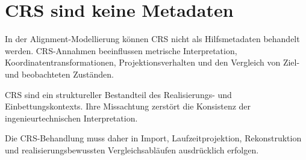 \section*{CRS sind keine Metadaten}

In der Alignment-Modellierung können CRS nicht als Hilfsmetadaten behandelt
werden. CRS-Annahmen beeinflussen metrische Interpretation,
Koordinatentransformationen, Projektionsverhalten und den Vergleich von Ziel-
und beobachteten Zuständen.

\begin{principle}
CRS sind ein struktureller Bestandteil des Realisierungs- und
Einbettungskontexts. Ihre Missachtung zerstört die Konsistenz der
ingenieurtechnischen Interpretation.
\end{principle}

Die CRS-Behandlung muss daher in Import, Laufzeitprojektion, Rekonstruktion
und realisierungsbewussten Vergleichsabläufen ausdrücklich erfolgen.
